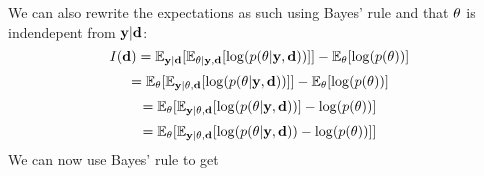 We can also rewrite the expectations as such using Bayes' rule and that $\mathbf{\theta}$ is indendepent from $\mathbf{y}|\mathbf{d}$:
\begin{equation}\label{eq:mi}I(\mathbf{d})  = \mathbb{E}_{\mathbf{y}|\mathbf{d}}[\mathbb{E}_{\theta| \mathbf{y}, \mathbf{d}} [\log(p(\theta | \mathbf{y}, \mathbf{d}))]] - \mathbb{E}_{\theta}[\log(p(\theta))]\end{equation}
\begin{equation}= \mathbb{E}_{\mathbf{\theta}}[\mathbb{E}_{\mathbf{y}| \theta, \mathbf{d}} [\log(p(\theta | \mathbf{y}, \mathbf{d}))]] - \mathbb{E}_{\theta}[\log(p(\theta))]\end{equation}
\begin{equation}= \mathbb{E}_{\mathbf{\theta}}[\mathbb{E}_{\mathbf{y}| \theta, \mathbf{d}} [\log(p(\theta | \mathbf{y}, \mathbf{d}))] - \log(p(\theta))]\end{equation}
\begin{equation}= \mathbb{E}_{\mathbf{\theta}}[\mathbb{E}_{\mathbf{y}| \theta, \mathbf{d}} [\log(p(\theta | \mathbf{y}, \mathbf{d})) - \log(p(\theta))]]\end{equation}
We can now use Bayes' rule to get

